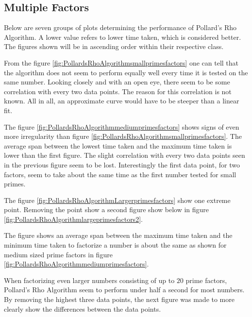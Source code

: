 \subsection{Multiple Factors}\label{PollardsMultipleFactors}

Below are seven groups of plots determining the performance of Pollard's Rho Algorithm. A lower value refers to lower time taken, which is considered better. The figures shown will be in ascending order within their respective class.



From the figure \ref{fig:PollardsRhoAlgorithmsmallprimesfactors} one can tell that the algorithm does not seem to perform equally well every time it is tested on the same number. Looking closely and with an open eye, there seem to be some correlation with every two data points. The reason for this correlation is not known. All in all, an approximate curve would have to be steeper than a linear fit. 



The figure \ref{fig:PollardsRhoAlgorithmmediumprimesfactors} shows signs of even more irregularity than figure \ref{fig:PollardsRhoAlgorithmsmallprimesfactors}. The average span between the lowest time taken and the maximum time taken is lower than the first figure. The slight correlation with every two data points seen in the previous figure seem to be lost. Interestingly the first data point, for two factors, seem to take about the same time as the first number tested for small primes.



The figure \ref{fig:PollardsRhoAlgorithmLargerprimesfactors} show one extreme point. Removing the point show a second figure show below in figure \ref{fig:PollardsRhoAlgorithmlargeprimesfactors2}.



The figure shows an average span between the maximum time taken and the minimum time taken to factorize a number is about the same as shown for medium sized prime factors in figure \ref{fig:PollardsRhoAlgorithmmediumprimesfactors}.



When factorizing even larger numbers consisting of up to $20$ prime factors, Pollard's Rho Algorithm seem to perform under half a second for most numbers. By removing the highest three data points, the next figure was made to more clearly show the differences between the data points.

